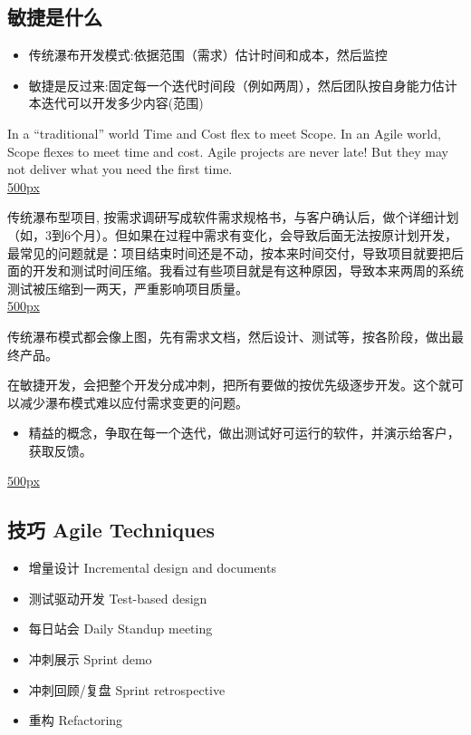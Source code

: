\documentclass[]{article}
\date{}
\providecommand{\tightlist}{%
  \setlength{\itemsep}{0pt}\setlength{\parskip}{0pt}}
\begin{document}
\hypertarget{ux654fux6377ux662fux4ec0ux4e48}{%
\subsection{敏捷是什么}\label{ux654fux6377ux662fux4ec0ux4e48}}

\begin{itemize}
\tightlist
\item
  传统瀑布开发模式:依据范围（需求）估计时间和成本，然后监控
\item
  敏捷是反过来:固定每一个迭代时间段（例如两周），然后团队按自身能力估计本迭代可以开发多少内容(范围)
\end{itemize}

In a ``traditional'' world Time and Cost flex to meet Scope. In an Agile
world, Scope flexes to meet time and cost. Agile projects are never
late! But they may not deliver what you need the first time.\\
\href{文件:P9.jpg}{500px}

传统瀑布型项目,
按需求调研写成软件需求规格书，与客户确认后，做个详细计划（如，3到6个月）。但如果在过程中需求有变化，会导致后面无法按原计划开发，最常见的问题就是：项目结束时间还是不动，按本来时间交付，导致项目就要把后面的开发和测试时间压缩。我看过有些项目就是有这种原因，导致本来两周的系统测试被压缩到一两天，严重影响项目质量。\\
\href{文件:P10.jpg}{500px}

传统瀑布模式都会像上图，先有需求文档，然后设计、测试等，按各阶段，做出最终产品。

在敏捷开发，会把整个开发分成冲刺，把所有要做的按优先级逐步开发。这个就可以减少瀑布模式难以应付需求变更的问题。

\begin{itemize}
\tightlist
\item
  精益的概念，争取在每一个迭代，做出测试好可运行的软件，并演示给客户，获取反馈。
\end{itemize}

\href{文件:P11.jpg}{500px}

\hypertarget{ux6280ux5de7-agile-techniques}{%
\subsection{技巧 Agile Techniques}\label{ux6280ux5de7-agile-techniques}}

\begin{itemize}
\tightlist
\item
  增量设计 Incremental design and documents
\item
  测试驱动开发 Test-based design
\item
  每日站会 Daily Standup meeting
\item
  冲刺展示 Sprint demo
\item
  冲刺回顾/复盘 Sprint retrospective
\item
  重构 Refactoring
\end{itemize}
\end{document}
